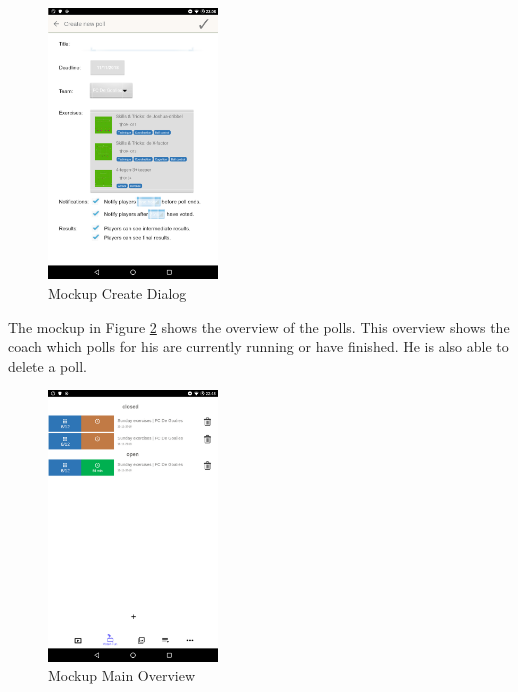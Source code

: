\begin{figure}[H]
    \begin{center}
        \includegraphics[width=0.4\textwidth]{images/mockups/create.png}
        \caption{Mockup Create Dialog}
        \label{fig:mockup_create}
    \end{center}
\end{figure}

The mockup in Figure \ref{fig:mockup_main} shows the overview of the polls. This overview shows the coach which polls for his are currently running or have finished. He is also able to delete a poll. 

\begin{figure}[H]
    \begin{center}
        \includegraphics[width=0.4\textwidth]{images/mockups/main-active.png}
        \caption{Mockup Main Overview}
        \label{fig:mockup_main}
    \end{center}
\end{figure}

